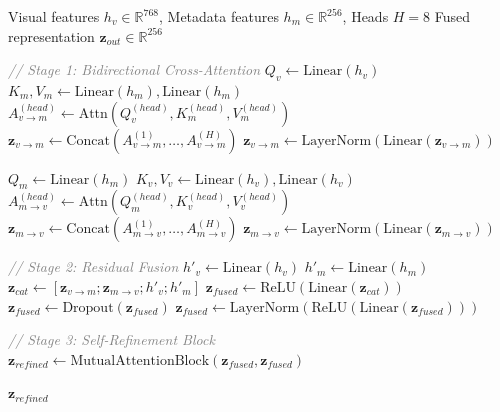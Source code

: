 \documentclass[journal,twoside,web]{ieeecolor}
\begin{document}
\begin{algorithm}[ht!]
\scriptsize
\caption{ Mutual Attention Fusion Mechanism.}
\label{alg:mutual_attention}
\begin{algorithmic}[1]
\renewcommand{\algorithmicrequire}{\textbf{Input:}}
\renewcommand{\algorithmicensure}{\textbf{Output:}}

\Require Visual features $h_v \in \mathbb{R}^{768}$, Metadata features $h_m \in \mathbb{R}^{256}$, Heads $H=8$
\Ensure Fused representation $\mathbf{z}_{out} \in \mathbb{R}^{256}$

\Statex \textcolor{gray}{\textit{// Stage 1: Bidirectional Cross-Attention}}
\State $Q_v \leftarrow \text{Linear}(h_v)$
\State $K_m, V_m \leftarrow \text{Linear}(h_m), \text{Linear}(h_m)$
    \State $A_{v \to m}^{(head)} \leftarrow \text{Attn}(Q_v^{(head)}, K_m^{(head)}, V_m^{(head)})$
\EndFor
\State $\mathbf{z}_{v \to m} \leftarrow \text{Concat}(A_{v \to m}^{(1)}, \dots, A_{v \to m}^{(H)})$
\State $\mathbf{z}_{v \to m} \leftarrow \text{LayerNorm}(\text{Linear}(\mathbf{z}_{v \to m}))$

\State $Q_m \leftarrow \text{Linear}(h_m)$
\State $K_v, V_v \leftarrow \text{Linear}(h_v), \text{Linear}(h_v)$
    \State $A_{m \to v}^{(head)} \leftarrow \text{Attn}(Q_m^{(head)}, K_v^{(head)}, V_v^{(head)})$
\EndFor
\State $\mathbf{z}_{m \to v} \leftarrow \text{Concat}(A_{m \to v}^{(1)}, \dots, A_{m \to v}^{(H)})$
\State $\mathbf{z}_{m \to v} \leftarrow \text{LayerNorm}(\text{Linear}(\mathbf{z}_{m \to v}))$

\Statex \textcolor{gray}{\textit{// Stage 2: Residual Fusion}}
\State $h'_v \leftarrow \text{Linear}(h_v)$
\State $h'_m \leftarrow \text{Linear}(h_m)$
\State $\mathbf{z}_{cat} \leftarrow [\mathbf{z}_{v \to m}; \mathbf{z}_{m \to v}; h'_v; h'_m]$
\State $\mathbf{z}_{fused} \leftarrow \text{ReLU}(\text{Linear}(\mathbf{z}_{cat}))$
\State $\mathbf{z}_{fused} \leftarrow \text{Dropout}(\mathbf{z}_{fused})$
\State $\mathbf{z}_{fused} \leftarrow \text{LayerNorm}(\text{ReLU}(\text{Linear}(\mathbf{z}_{fused})))$

\Statex \textcolor{gray}{\textit{// Stage 3: Self-Refinement Block}}
\State $\mathbf{z}_{refined} \leftarrow \text{MutualAttentionBlock}(\mathbf{z}_{fused}, \mathbf{z}_{fused})$

\State \Return $\mathbf{z}_{refined}$

\end{algorithmic}
\end{algorithm}
\end{document}
